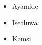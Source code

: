 \documentclass{article}
\begin{document}
\begin{itemize}
	\item Ayomide
	\item Iseoluwa
	\item Kamsi
\end{itemize}
\end{document}
